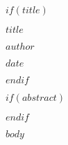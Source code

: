 \documentclass[11pt,oneside]{report}
\begin{document}
$if(title)$
\begin{titlepage}
  \centering
  \vspace*{1cm}
  {\Huge\bfseries $title$\par}
  \vspace{1.5cm}
  {\Large\itshape $author$\par}
  \vfill
  {\large $date$\par}
  \vspace{1cm}
\end{titlepage}
$endif$

$if(abstract)$
\begin{abstract}
$abstract$
\end{abstract}
$endif$

\tableofcontents
\newpage

$body$
\end{document}

